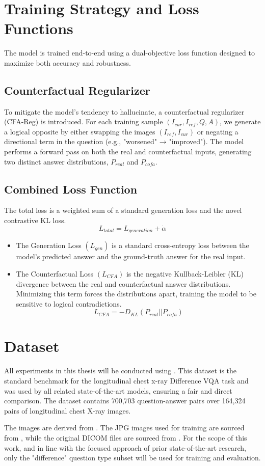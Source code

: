 \section{Training Strategy and Loss Functions}
The model is trained end-to-end using a dual-objective loss function designed to maximize both accuracy and robustness.

\subsection{Counterfactual Regularizer}
To mitigate the model's tendency to hallucinate, a counterfactual regularizer (CFA-Reg) is introduced. For each training sample $(I_{cur},I_{ref}, Q, A)$, we generate a logical opposite by either swapping the images $(I_{ref},I_{cur})$ or negating a directional term in the question (e.g., "worsened" → "improved"). The model performs a forward pass on both the real and counterfactual inputs, generating two distinct answer distributions, $P_{real}$ and $P_{cofa}$.

\subsection{Combined Loss Function}
The total loss is a weighted sum of a standard generation loss and the novel contrastive KL loss.
$$ L_{total} = L_{generation} + \dot{\alpha} $$

\begin{itemize}
	\item The Generation Loss $(L_{gen})$ is a standard cross-entropy loss between the model's predicted answer and the ground-truth answer for the real input.
	\item The Counterfactual Loss $(L_{CFA})$ is the negative Kullback-Leibler (KL) divergence between the real and counterfactual answer distributions. Minimizing this term forces the distributions apart, training the model to be sensitive to logical contradictions.
	\[
	L_{CFA} = -D_{KL}(P_{real}||P_{cofa})
	\]
\end{itemize}

\section{Dataset}
All experiments in this thesis will be conducted using \cite{medical-dff-vqa}. This dataset is the standard benchmark for the longitudinal chest x-ray Difference VQA task and was used by all related state-of-the-art models, ensuring a fair and direct comparison. The dataset contains 700,703 question-answer pairs over 164,324 pairs of longitudinal chest X-ray images.

The images are derived from \cite{mimic-cxr}. The JPG images used for training are sourced from \cite{mimic-cxr-jpg}, while the original DICOM files are sourced from \cite{mimic-cxr}. For the scope of this work, and in line with the focused approach of prior state-of-the-art research, only the "difference" question type subset will be used for training and evaluation.





